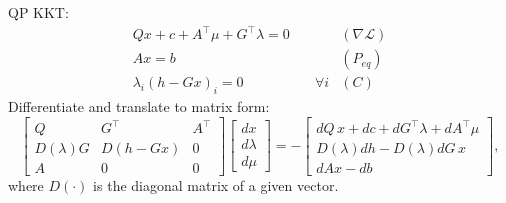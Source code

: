 \documentclass[11pt,twoside]{article}
\newcommand{\Lagr}{\mathcal{L}}
\begin{document}
QP KKT:
\begin{equation}
	\begin{aligned}
		Qx + c +A^\top\mu + G^\top\lambda = 0 & & (\nabla \Lagr)\\
		Ax=b && (P_{eq}) \\
		\lambda_i (h-Gx)_i = 0 & \quad \forall i & (C) 
	\end{aligned}
\end{equation}
Differentiate and translate to matrix form:
\begin{equation}
	\begin{bmatrix}
		Q & G^\top & A^\top \\
		D(\lambda)G & D(h - Gx) & 0 \\
		A & 0 & 0
	\end{bmatrix}
	\begin{bmatrix}
		dx \\
		d\lambda \\
		d\mu
	\end{bmatrix}
	= -
	\begin{bmatrix}
		dQ \, x + dc + dG^\top \lambda + dA^\top \mu \\
		D(\lambda)dh - D(\lambda)dG \, x \\
		dAx - db
	\end{bmatrix},
\end{equation}
where $D(\cdot)$ is the diagonal matrix of a given vector.
\end{document}
